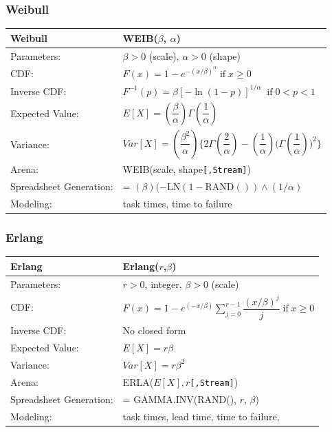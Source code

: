 \documentclass[
]{book}
\theoremstyle{definition}
\theoremstyle{definition}
\theoremstyle{definition}
\theoremstyle{definition}
\theoremstyle{remark}
\begin{document}
\hypertarget{weibull}{%
\subsubsection*{Weibull}\label{weibull}}


\begin{longtable}[]{@{}ll@{}}
\toprule
\textbf{Weibull} & WEIB(\(\beta\), \(\alpha\)) \\
\midrule
\endhead
Parameters: & \(\beta > 0\) (scale), \(\alpha > 0\) (shape) \\
CDF: & \(F(x) = 1- e^{-(x/\beta)^\alpha} \; \text{if} \; x \geq 0\) \\
Inverse CDF: & \(F^{-1}(p) = \beta\left[ -\ln (1-p)\right]^{1/\alpha} \; \; \text{if} \; 0 < p < 1\) \\
Expected Value: & \(E[X] = \left(\dfrac{\beta}{\alpha}\right)\Gamma\left(\dfrac{1}{\alpha}\right)\) \\
Variance: & \(Var[X] = \left(\dfrac{\beta^2}{\alpha}\right)\biggl\lbrace 2\Gamma\left(\dfrac{2}{\alpha}\right) - \left(\dfrac{1}{\alpha}\right)\biggl(\Gamma\left(\dfrac{1}{\alpha}\right)\biggr)^2\biggr\rbrace\) \\
Arena: & WEIB(scale, shape\texttt{{[},Stream{]}}) \\
Spreadsheet Generation: & = \((\beta)(-\text{LN}(1-\text{RAND}())\wedge(1/\alpha)\) \\
Modeling: & task times, time to failure \\
\bottomrule
\end{longtable}

\hypertarget{erlang}{%
\subsubsection*{Erlang}\label{erlang}}


\begin{longtable}[]{@{}ll@{}}
\toprule
\textbf{Erlang} & Erlang(\(r\),\(\beta\)) \\
\midrule
\endhead
Parameters: & \(r > 0\), integer, \(\beta > 0\) (scale) \\
CDF: & \(F(x) = 1- e^{(-x/\beta)}\sum\limits_{j=0}^{r-1}\dfrac{(x/\beta)^j}{j} \; \text{if} \; x \geq 0\) \\
Inverse CDF: & No closed form \\
Expected Value: & \(E[X] = r\beta\) \\
Variance: & \(Var[X] = r\beta^2\) \\
Arena: & ERLA(\(E[X], r\)\texttt{{[},Stream{]}}) \\
Spreadsheet Generation: & = GAMMA.INV(RAND(), \(r\), \(\beta\)) \\
Modeling: & task times, lead time, time to failure, \\
\bottomrule
\end{longtable}
\end{document}
